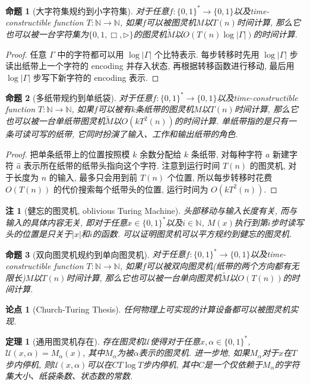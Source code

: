 \documentclass[8pt]{article}
\theoremstyle{compact}
\newtheorem{theorem}{定理}
\newtheorem{proposition}{命题}
\newtheorem{remark}{注}
\newtheorem{thesis}{论点}
\begin{document}
\begin{proposition}[大字符集规约到小字符集]
	对于任意$f: \{0, 1\}^* \to \{0, 1\}$以及time-constructible function $T: \mathbb{N} \to \mathbb{N}$, 如果$f$可以被图灵机$M$以$T(n)$时间计算, 那么它也可以被一台字符集为$\{0, 1, \Box, \triangleright\}$的图灵机$\tilde{M}$以$O(T(n)\log |\Gamma|)$的时间计算. 
\end{proposition}
\begin{proof}
	任意 $\Gamma$ 中的字符都可以用 $\log |\Gamma|$ 个比特表示. 每步转移时先用 $\log |\Gamma|$ 步读出纸带上一个字符的 encoding 并存入状态, 再根据转移函数进行移动, 最后用 $\log |\Gamma|$ 步写下新字符的 encoding 表示.
\end{proof}
\begin{proposition}[多纸带规约到单纸袋]
	对于任意$f: \{0, 1\}^* \to \{0, 1\}$以及time-constructible function $T: \mathbb{N} \to \mathbb{N}$, 如果$f$可以被有$k$条纸带的图灵机$M$以$T(n)$时间计算, 那么它也可以被一台单纸带图灵机$\tilde{M}$以$O(kT^2(n))$的时间计算. 单纸带指的是只有一条可读可写的纸带, 它同时扮演了输入、工作和输出纸带的角色. 
\end{proposition}
\begin{proof}
	把单条纸带上的位置按照模 $k$ 余数分配给 $k$ 条纸带, 对每种字符 $a$ 新建字符 $\hat a$ 表示所在纸带的纸带头指向这个字符. 注意到运行时间 $T(n)$ 的图灵机, 对于长度为 $n$ 的输入, 最多只会用到前 $T(n)$ 个位置, 所以每步转移时花费 $O(T(n))$ 的代价搜索每个纸带头的位置, 运行时间为 $O(kT^2(n))$.
\end{proof}
\begin{remark}[健忘的图灵机, oblivious Turing Machine]
	头部移动与输入长度有关, 而与输入的具体内容无关, 即对于任意$x \in \{0, 1\}^*$以及$i \in \mathbb N$, $M(x)$执行到第$i$步时读写头的位置是只关于$|x|$和$i$的函数. 可以证明图灵机可以平方规约到健忘的图灵机. 
\end{remark}
\begin{proposition}[双向图灵机规约到单向图灵机]
	对于任意$f: \{0, 1\}^* \to \{0, 1\}$以及time-constructible function $T: \mathbb{N} \to \mathbb{N}$, 如果$f$可以被双向图灵机(纸带的两个方向都有无限长)$M$以$T(n)$时间计算, 那么它也可以被一台单向图灵机$\tilde{M}$以$O(T(n))$的时间计算. 
\end{proposition}
\begin{thesis}[Church-Turing Thesis]
	任何物理上可实现的计算设备都可以被图灵机实现. 
\end{thesis}
\begin{theorem}[通用图灵机存在]
	存在图灵机$\mathcal U$使得对于任意$x, \alpha \in \{0, 1\}^*$, $\mathcal U(x, \alpha) = M_{\alpha}(x)$, 其中$M_{\alpha}$为被$\alpha$表示的图灵机. 进一步地, 如果$M_{\alpha}$对于$x$在$T$步内停机, 则$\mathcal U(x, \alpha)$可以在$CT\log T$步内停机, 其中$C$是一个仅依赖于$M_{\alpha}$的字符集大小、纸袋条数、状态数的常数. 
\end{theorem}
\end{document}
